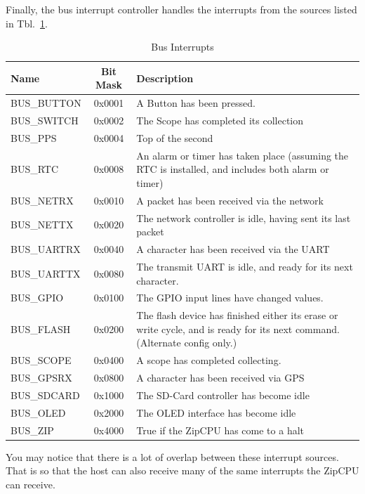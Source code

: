 \documentclass{gqtekspec}
\begin{document}
Finally, the bus interrupt controller handles the interrupts from the sources
listed in Tbl.~\ref{tbl:bus-ints}.
\begin{table}[htbp]
\begin{center}\begin{tabular}{|p{0.9in}|c|p{3.75in}|}\hline
\rowcolor[gray]{0.85} Name & Bit Mask & Description \\\hline\hline
BUS\_BUTTON & 0x0001 & A Button has been pressed. \\\hline
BUS\_SWITCH & 0x0002 & The Scope has completed its collection\\\hline
BUS\_PPS    & 0x0004 & Top of the second\\\hline
BUS\_RTC    & 0x0008 & An alarm or timer has taken place (assuming the RTC
		is installed, and includes both alarm or timer)\\\hline
BUS\_NETRX & 0x0010 & A packet has been received via the network\\\hline
BUS\_NETTX & 0x0020 & The network controller is idle, having sent its
			last packet\\\hline
BUS\_UARTRX & 0x0040 & A character has been received via the UART\\\hline
BUS\_UARTTX & 0x0080 & The transmit UART is idle, and ready for its next
		character.\\\hline
BUS\_GPIO   & 0x0100 & The GPIO input lines have changed values.\\\hline
BUS\_FLASH  & 0x0200 & The flash device has finished either its erase or
		write cycle, and is ready for its next command. (Alternate
	config only.)\\\hline
BUS\_SCOPE  & 0x0400 & A scope has completed collecting.\\\hline
BUS\_GPSRX  & 0x0800 & A character has been received via GPS\\\hline
BUS\_SDCARD & 0x1000 & The SD-Card controller has become idle\\\hline
BUS\_OLED   & 0x2000 & The OLED interface has become idle\\\hline
BUS\_ZIP    & 0x4000 & True if the ZipCPU has come to a halt\\\hline
\end{tabular}
\caption{Bus Interrupts}\label{tbl:bus-ints}
\end{center}\end{table}
You may notice that there is a lot of overlap between these interrupt sources.
That is so that the host can also receive many of the same interrupts the ZipCPU
can receive.
\end{document}
